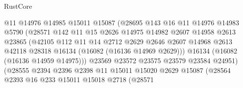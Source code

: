 \begin{lexlean}{RustCore}
\begin{coremodule}
                                @11
                                @14976
                                @14985
                                @15011
                                @15087
                                (@28695
                                  @143
                                  @16
                                  @11
                                  @14976
                                  @14983
                                  @5790
                                  (@28571
                                    @142
                                    @11
                                    @15
                                    @2626
                                    @14975
                                    @14982
                                    @2607
                                    @14958
                                    @2613
                                    @23865
                                    (@42105
                                      @112
                                      @11
                                      @14
                                      @2712
                                      @2629
                                      @2646
                                      @2607
                                      @14968
                                      @2613
                                      @42118
                                      @28318
                                      @16134
                                      (@16082 (@16136 @14969 @2629)))
                                    @16134
                                    (@16082 (@16136 @14959 @14975)))
                                  @23569
                                  @23572
                                  @23575
                                  @23579
                                  @23584
                                  @24951)
                                (@28555
                                  @2394
                                  @2396
                                  @2398
                                  @11
                                  @15011
                                  @15020
                                  @2629
                                  @15087
                                  (@28564
                                    @2393
                                    @16
                                    @233
                                    @15011
                                    @15018
                                    @2718
                                    (@28571

\end{coremodule}
\end{lexlean}
